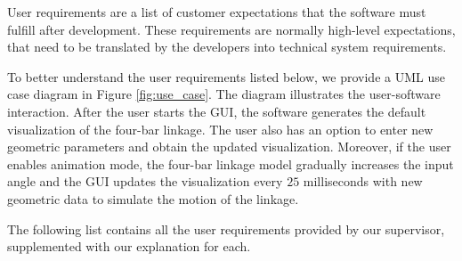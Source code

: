\documentclass{article}
\begin{document}
User requirements are a list of customer expectations that the software must fulfill after development. These requirements are normally high-level expectations, that need to be translated by the developers into technical system requirements.

To better understand the user requirements listed below, we provide a UML use case diagram in Figure \ref{fig:use_case}. The diagram illustrates the user-software interaction. After the user starts the GUI, the software generates the default visualization of the four-bar linkage. The user also has an option to enter new geometric parameters and obtain the updated visualization. Moreover, if the user enables animation mode, the four-bar linkage model gradually increases the input angle and the GUI updates the visualization every $25$ milliseconds with new geometric data to simulate the motion of the linkage.

The following list contains all the user requirements provided by our supervisor, supplemented with our explanation for each.
\end{document}
